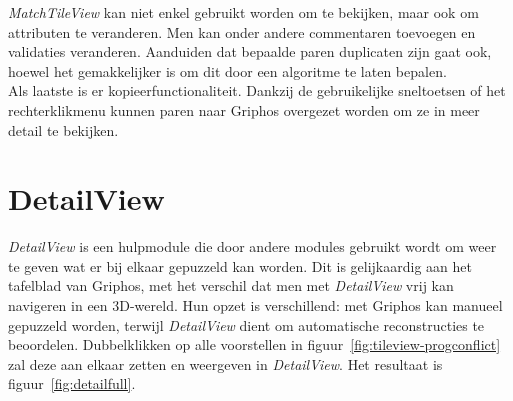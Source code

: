 \emph{MatchTileView} kan niet enkel gebruikt worden om te bekijken, maar ook om attributen te veranderen. Men kan onder andere commentaren toevoegen en validaties veranderen. Aanduiden dat bepaalde paren duplicaten zijn gaat ook, hoewel het gemakkelijker is om dit door een algoritme te laten bepalen.\\

Als laatste is er kopieerfunctionaliteit. Dankzij de gebruikelijke sneltoetsen of het rechterklikmenu kunnen paren naar Griphos overgezet worden om ze in meer detail te bekijken.

\section{DetailView}
\label{sec:detailview}

\emph{DetailView} is een hulpmodule die door andere modules gebruikt wordt om weer te geven wat er bij elkaar gepuzzeld kan worden. Dit is gelijkaardig aan het tafelblad van Griphos, met het verschil dat men met \emph{DetailView} vrij kan navigeren in een 3D-wereld. Hun opzet is verschillend: met Griphos kan manueel gepuzzeld worden, terwijl \emph{DetailView} dient om automatische reconstructies te beoordelen. Dubbelklikken op alle voorstellen in figuur~\ref{fig:tileview-progconflict} zal deze aan elkaar zetten en weergeven in \emph{DetailView}. Het resultaat is figuur~\ref{fig:detailfull}.\\

